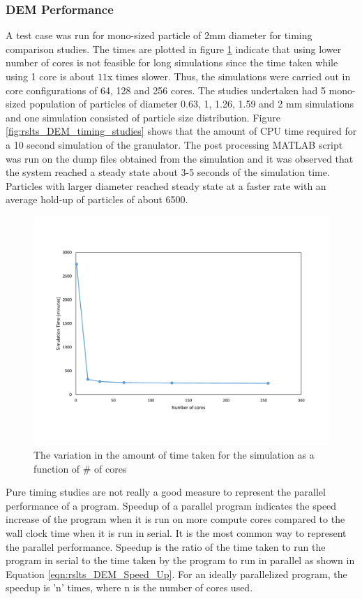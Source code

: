 \documentclass[preprint,11pt,authoryear]{elsarticle}
\begin{document}
\subsubsection{DEM Performance}
A test case was run for mono-sized particle of 2mm diameter for timing comparison studies. The 
times are plotted in figure \ref{fig:rslts_DEM_2mm_timing} indicate that using lower number of cores is 
not feasible for long simulations since the time taken while using 1 core is about $11$x times slower.
Thus, the simulations were carried out in core configurations of 64, 128 and 256 cores. The studies 
undertaken had 5 mono-sized population of particles of diameter 0.63, 1, 1.26, 1.59 and 2 mm 
simulations and one simulation consisted of particle size distribution. Figure 
\ref{fig:rslts_DEM_timing_studies} shows that the amount of CPU time required for a 10 second 
simulation of the granulator. The post processing MATLAB script was run on the dump files obtained 
from the simulation and it was observed that the system reached a steady state about 3-5 seconds of 
the simulation time. Particles with larger diameter reached steady state at a faster rate with an average 
hold-up of particles of about 6500. 
\begin{figure}[H]
\centering
\includegraphics[scale=0.5]{rslts_DEM_2mm_timing.pdf}
\caption{The variation in the amount of time taken for the simulation as a function of \# of cores}
\label{fig:rslts_DEM_2mm_timing}
\end{figure}	

Pure timing studies are not really a good measure to represent the parallel performance of a program. 
Speedup of a parallel program indicates the speed increase of the program when it is run on more 
compute cores compared to the wall clock time when it is run in serial. It is the most common way to 
represent the parallel performance. Speedup is the ratio of the time taken to run the program in serial 
to the time taken by the program to run in parallel as shown in Equation \ref{eqn:rslts_DEM_Speed_Up}. 
For an ideally parallelized program, the speedup is 'n' times, where n is the number of cores used.\\
\end{document}
